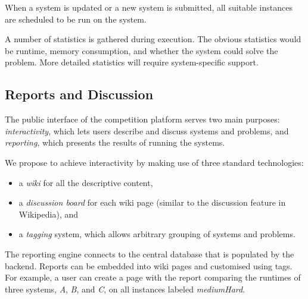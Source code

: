 When a system is updated or a new system is submitted, all suitable instances are scheduled to be run on the system.

A number of statistics is gathered during execution. The obvious statistics would be runtime, memory consumption, and whether the system could solve the problem. More detailed statistics will require system-specific support.

\subsection{Reports and Discussion}

The public interface of the competition platform serves two main purposes: \emph{interactivity}, which lets users describe and discuss systems and problems, and \emph{reporting}, which presents the results of running the systems.

We propose to achieve interactivity by making use of three standard technologies:
\begin{itemize}
  \item a \emph{wiki} for all the descriptive content,
  \item a \emph{discussion board} for each wiki page (similar to the discussion feature in Wikipedia), and
  \item a \emph{tagging} system, which allows arbitrary grouping of systems and problems.
\end{itemize}

The reporting engine connects to the central database that is populated by the backend. Reports can be embedded into wiki pages and customised using tags. For example, a user can create a page with the report comparing the runtimes of three systems, \emph{A}, \emph{B}, and \emph{C}, on all instances labeled \emph{mediumHard}.
